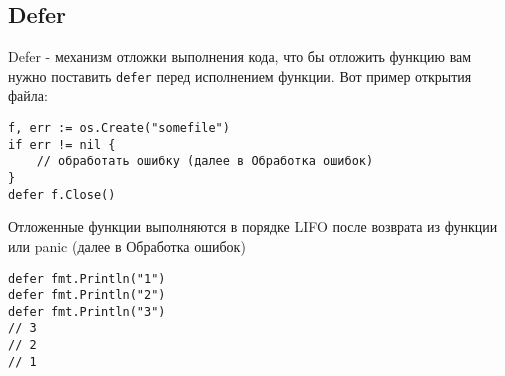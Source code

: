 \subsection{Defer}
Defer - механизм отложки выполнения кода, что бы отложить функцию вам нужно поставить \verb|defer| перед исполнением функции. Вот пример открытия файла:
\begin{verbatim}
f, err := os.Create("somefile")
if err != nil {
    // обработать ошибку (далее в Обработка ошибок)
}
defer f.Close()
\end{verbatim}

\noindent Отложенные функции выполняются в порядке LIFO после возврата из функции или panic (далее в Обработка ошибок)
\begin{verbatim}
defer fmt.Println("1")
defer fmt.Println("2")
defer fmt.Println("3")
// 3
// 2
// 1
\end{verbatim}
